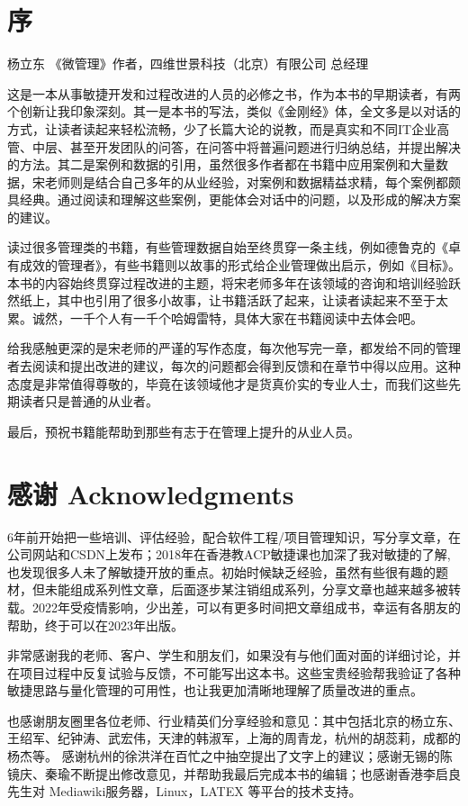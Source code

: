 \chapter*{序} %


杨立东 《微管理》作者，四维世景科技（北京）有限公司 总经理

这是一本从事敏捷开发和过程改进的人员的必修之书，作为本书的早期读者，有两个创新让我印象深刻。其一是本书的写法，类似《金刚经》体，全文多是以对话的方式，让读者读起来轻松流畅，少了长篇大论的说教，而是真实和不同IT企业高管、中层、甚至开发团队的问答，在问答中将普遍问题进行归纳总结，并提出解决的方法。其二是案例和数据的引用，虽然很多作者都在书籍中应用案例和大量数据，宋老师则是结合自己多年的从业经验，对案例和数据精益求精，每个案例都颇具经典。通过阅读和理解这些案例，更能体会对话中的问题，以及形成的解决方案的建议。

读过很多管理类的书籍，有些管理数据自始至终贯穿一条主线，例如德鲁克的《卓有成效的管理者》，有些书籍则以故事的形式给企业管理做出启示，例如《目标》。本书的内容始终贯穿过程改进的主题，将宋老师多年在该领域的咨询和培训经验跃然纸上，其中也引用了很多小故事，让书籍活跃了起来，让读者读起来不至于太累。诚然，一千个人有一千个哈姆雷特，具体大家在书籍阅读中去体会吧。

给我感触更深的是宋老师的严谨的写作态度，每次他写完一章，都发给不同的管理者去阅读和提出改进的建议，每次的问题都会得到反馈和在章节中得以应用。这种态度是非常值得尊敬的，毕竟在该领域他才是货真价实的专业人士，而我们这些先期读者只是普通的从业者。

最后，预祝书籍能帮助到那些有志于在管理上提升的从业人员。

\begin{description}
\item[]
\end{description}


\chapter*{感谢 Acknowledgments } %

6年前开始把一些培训、评估经验，配合软件工程/项目管理知识，写分享文章，在公司网站和CSDN上发布；2018年在香港教ACP敏捷课也加深了我对敏捷的了解,也发现很多人未了解敏捷开放的重点。初始时候缺乏经验，虽然有些很有趣的题材，但未能组成系列性文章，后面逐步某注销组成系列，分享文章也越来越多被转载。2022年受疫情影响，少出差，可以有更多时间把文章组成书，幸运有各朋友的帮助，终于可以在2023年出版。

非常感谢我的老师、客户、学生和朋友们，如果没有与他们面对面的详细讨论，并在项目过程中反复试验与反馈，不可能写出这本书。这些宝贵经验帮我验证了各种敏捷思路与量化管理的可用性，也让我更加清晰地理解了质量改进的重点。

也感谢朋友圈里各位老师、行业精英们分享经验和意见：其中包括北京的杨立东、王绍军、纪钟涛、武宏伟，天津的韩淑军，上海的周青龙，杭州的胡蕊莉，成都的杨杰等。
感谢杭州的徐洪洋在百忙之中抽空提出了文字上的建议；感谢无锡的陈镜庆、秦瑜不断提出修改意见，并帮助我最后完成本书的编辑；也感谢香港李启良先生对
Mediawiki服务器，Linux，LATEX 等平台的技术支持。